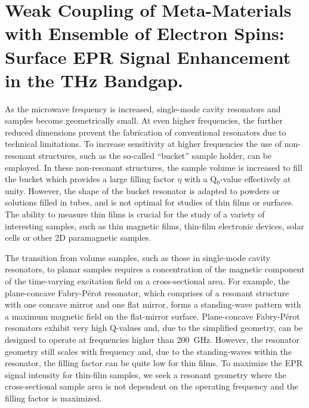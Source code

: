 \chapter[Weak Coupling of Meta-Materials for FD-FT THz EPR]{Weak Coupling of Meta-Materials with Ensemble of Electron Spins: Surface EPR Signal Enhancement in the THz Bandgap.}


As the microwave frequency is increased, single-mode cavity resonators and samples become geometrically small. At even higher frequencies, the further reduced dimensions prevent the fabrication of conventional resonators due to technical limitations. To increase sensitivity at higher frequencies the use of non-resonant structures, such as the so-called ``bucket'' sample holder, can be employed. In these non-resonant structures, the sample volume is increased to fill the bucket which provides a large filling factor $\eta$ with a Q$_0$-value effectively at unity. \cite{grinbergVHF} However, the shape of the bucket resonator is adapted to powders or solutions filled in tubes, and is not optimal for studies of thin films or surfaces. The ability to measure thin films is crucial for the study of a variety of interesting samples, such as thin magnetic films, thin-film electronic devices, solar cells or other 2D paramagnetic samples.

The transition from volume samples, such as those in single-mode cavity resonators, to planar samples requires a concentration of the magnetic component of the time-varying excitation field on a cross-sectional area. For example, the plane-concave Fabry-P\'{e}rot resonator, which comprises of a resonant structure with one concave mirror and one flat mirror, forms a standing-wave pattern with a maximum magnetic field on the flat-mirror surface. \cite{grinbergVHF} Plane-concave Fabry-P\'{e}rot resonators exhibit very high Q-values and, due to the simplified geometry, can be designed to operate at frequencies higher than 200~GHz. \cite{Clarke1982Fabry, BraakmanFabry} However, the resonator geometry still scales with frequency and, due to the standing-waves within the resonator, the filling factor can be quite low for thin films. To maximize the EPR signal intensity for thin-film samples, we seek a resonant geometry where the cross-sectional sample area is not dependent on the operating frequency and the filling factor is maximized. 

